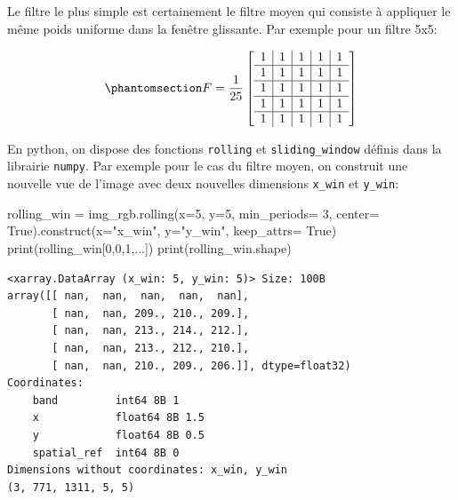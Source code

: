 \documentclass[
  11pt,
  letterpaper,
  open=any,
  twoside=false,
  french]{scrbook}
\newenvironment{Shaded}{\begin{snugshade}}{\end{snugshade}}
\newcommand{\BuiltInTok}[1]{\textcolor[rgb]{0.00,0.23,0.31}{#1}}
\newcommand{\DecValTok}[1]{\textcolor[rgb]{0.68,0.00,0.00}{#1}}
\newcommand{\NormalTok}[1]{\textcolor[rgb]{0.00,0.23,0.31}{#1}}
\newcommand{\OperatorTok}[1]{\textcolor[rgb]{0.37,0.37,0.37}{#1}}
\newcommand{\StringTok}[1]{\textcolor[rgb]{0.13,0.47,0.30}{#1}}
\newcommand{\VariableTok}[1]{\textcolor[rgb]{0.07,0.07,0.07}{#1}}
\begin{document}
Le filtre le plus simple est certainement le filtre moyen qui consiste à
appliquer le même poids uniforme dans la fenêtre glissante. Par exemple
pour un filtre 5x5:

\begin{equation}\phantomsection\label{eq-boxfilter}{
F= \frac{1}{25}\left[
\begin{array}{c|c|c|c|c}
1 & 1 & 1 & 1 & 1 \\
\hline
1 & 1 & 1 & 1 & 1 \\
\hline
1 & 1 & 1 & 1 & 1 \\
\hline
1 & 1 & 1 & 1 & 1 \\
\hline
1 & 1 & 1 & 1 & 1
\end{array}
\right]
}\end{equation}

En python, on dispose des fonctions \texttt{rolling} et
\texttt{sliding\_window} définis dans la librairie \texttt{numpy}. Par
exemple pour le cas du filtre moyen, on construit une nouvelle vue de
l'image avec deux nouvelles dimensions \texttt{x\_win} et
\texttt{y\_win}:

\begin{Shaded}
\begin{Highlighting}[]
\NormalTok{rolling\_win }\OperatorTok{=}\NormalTok{ img\_rgb.rolling(x}\OperatorTok{=}\DecValTok{5}\NormalTok{, y}\OperatorTok{=}\DecValTok{5}\NormalTok{,  min\_periods}\OperatorTok{=} \DecValTok{3}\NormalTok{, center}\OperatorTok{=} \VariableTok{True}\NormalTok{).construct(x}\OperatorTok{=}\StringTok{"x\_win"}\NormalTok{, y}\OperatorTok{=}\StringTok{"y\_win"}\NormalTok{, keep\_attrs}\OperatorTok{=} \VariableTok{True}\NormalTok{)}
\BuiltInTok{print}\NormalTok{(rolling\_win[}\DecValTok{0}\NormalTok{,}\DecValTok{0}\NormalTok{,}\DecValTok{1}\NormalTok{,...])}
\BuiltInTok{print}\NormalTok{(rolling\_win.shape)}
\end{Highlighting}
\end{Shaded}

\begin{verbatim}
<xarray.DataArray (x_win: 5, y_win: 5)> Size: 100B
array([[ nan,  nan,  nan,  nan,  nan],
       [ nan,  nan, 209., 210., 209.],
       [ nan,  nan, 213., 214., 212.],
       [ nan,  nan, 213., 212., 210.],
       [ nan,  nan, 210., 209., 206.]], dtype=float32)
Coordinates:
    band         int64 8B 1
    x            float64 8B 1.5
    y            float64 8B 0.5
    spatial_ref  int64 8B 0
Dimensions without coordinates: x_win, y_win
(3, 771, 1311, 5, 5)
\end{verbatim}
\end{document}
